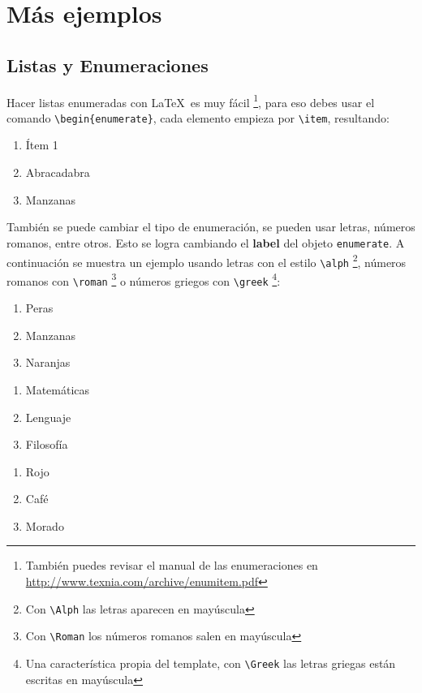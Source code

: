 \section{Más ejemplos}
	
	\subsection{Listas y Enumeraciones}
		
		Hacer listas enumeradas con \LaTeX\ es muy fácil \footnote{También puedes revisar el manual de las enumeraciones en \url{http://www.texnia.com/archive/enumitem.pdf}}, para eso debes usar el comando \texttt{\textbackslash begin\{enumerate\}}, cada elemento empieza por \texttt{\textbackslash item}, resultando:
		
		\begin{enumerate}
			\item Ítem 1
			\item Abracadabra
			\item Manzanas
		\end{enumerate}
		
		También se puede cambiar el tipo de enumeración, se pueden usar letras, números romanos, entre otros. Esto se logra cambiando el \textbf{label} del objeto \texttt{enumerate}. A continuación se muestra un ejemplo usando letras con el estilo \texttt{\textbackslash alph} \footnote{Con \texttt{\textbackslash Alph} las letras aparecen en mayúscula}, números romanos con \texttt{\textbackslash roman} \footnote{Con \texttt{\textbackslash Roman} los números romanos salen en mayúscula} o números griegos con \texttt{\textbackslash greek} \footnote{Una característica propia del template, con \texttt{\textbackslash Greek} las letras griegas están escritas en mayúscula}:
		
		\begin{multicols}{3}
			\begin{enumerate}[label=\alph*) ,font=\bfseries] %
				\item Peras
				\item Manzanas
				\item Naranjas
			\end{enumerate}
			
			\begin{enumerate}[label=\greek*) ]
				\item Matemáticas
				\item Lenguaje
				\item Filosofía
			\end{enumerate}
		
			\begin{enumerate}[label=\roman*) ]
				\item Rojo
				\item Café
				\item Morado
			\end{enumerate}
		\end{multicols}
		

